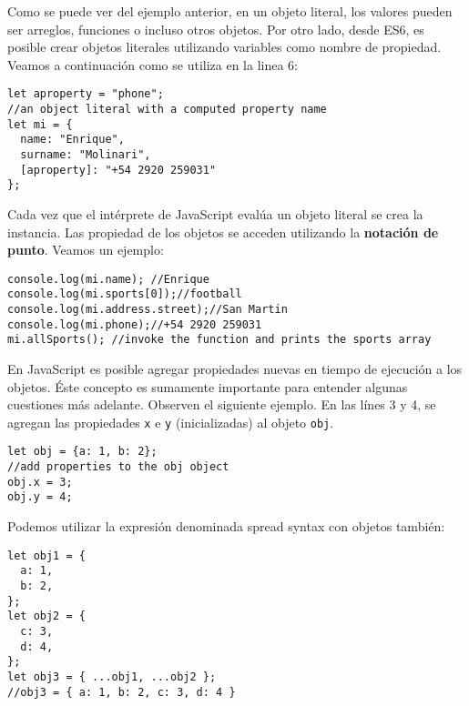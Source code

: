 \documentclass[a4paper, oneside, titlepage, 12pt]{book}
\begin{document}
Como se puede ver del ejemplo anterior, en un objeto literal, los valores pueden ser arreglos, funciones o incluso otros objetos. Por otro lado, desde ES6, es posible crear objetos literales utilizando variables como nombre de propiedad. Veamos a continuación como se utiliza en la linea 6: 

\begin{verbatim}
let aproperty = "phone";               
//an object literal with a computed property name 
let mi = {
  name: "Enrique",
  surname: "Molinari",
  [aproperty]: "+54 2920 259031"
};

\end{verbatim}

Cada vez que el intérprete de JavaScript evalúa un objeto literal se crea la instancia. Las propiedad de los objetos se acceden utilizando la \textbf{notación de punto}. Veamos un ejemplo:

\begin{verbatim}
console.log(mi.name); //Enrique
console.log(mi.sports[0]);//football
console.log(mi.address.street);//San Martin
console.log(mi.phone);//+54 2920 259031
mi.allSports(); //invoke the function and prints the sports array               
\end{verbatim}

En JavaScript es posible agregar propiedades nuevas en tiempo de ejecución a los objetos. Éste concepto es sumamente importante para entender algunas cuestiones más adelante. Observen el siguiente ejemplo. En las línes 3 y 4, se agregan las propiedades \texttt{x} e \texttt{y} (inicializadas) al objeto \texttt{obj}.

\begin{verbatim}
let obj = {a: 1, b: 2};
//add properties to the obj object
obj.x = 3;
obj.y = 4;
\end{verbatim}

Podemos utilizar la expresión denominada spread syntax con objetos también:

\begin{verbatim}
let obj1 = {
  a: 1,
  b: 2,
};
let obj2 = {
  c: 3,
  d: 4,
};
let obj3 = { ...obj1, ...obj2 };
//obj3 = { a: 1, b: 2, c: 3, d: 4 }
\end{verbatim}
\end{document}
